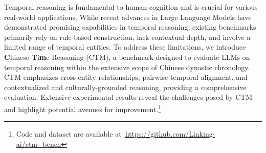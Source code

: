 Temporal reasoning is fundamental to human cognition and is crucial for various real-world applications. 
While recent advances in Large Language Models have demonstrated promising capabilities in temporal reasoning, existing benchmarks primarily rely on rule-based construction, lack contextual depth, and involve a limited range of temporal entities. 
To address these limitations, we introduce \textbf{C}hinese \textbf{T}i\textbf{m}e Reasoning (CTM), a benchmark designed to evaluate LLMs on temporal reasoning within the extensive scope of Chinese dynastic chronology.
CTM emphasizes cross-entity relationships, pairwise temporal alignment, and contextualized and culturally-grounded reasoning, providing a comprehensive evaluation. 
Extensive experimental results reveal the challenges posed by CTM and highlight potential avenues for improvement.\footnote{Code and dataset are available at~\url{https://github.com/Linking-ai/ctm_bench}}
